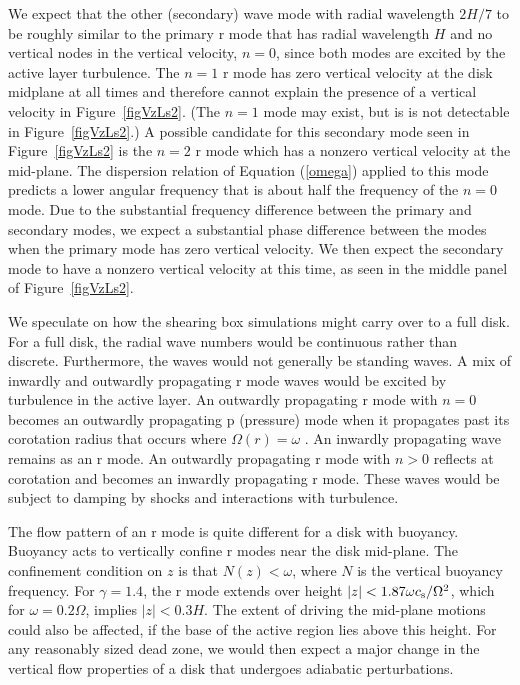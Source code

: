 We expect that the other (secondary) wave mode with radial wavelength $2H/7$ to be roughly similar to the primary r mode that has radial wavelength $H$ and no vertical nodes in the vertical velocity, $n=0$, 
since both modes are excited by the active layer turbulence.
The $n=1$ r mode has zero vertical velocity at the disk midplane at all times
and therefore cannot explain the presence of a vertical velocity in Figure~\ref{figVzLs2}. (The $n=1$ mode may exist, but is
is not detectable in Figure~\ref{figVzLs2}.)
A possible candidate for this secondary mode seen in Figure~\ref{figVzLs2} is the $n=2$ r mode which has a nonzero vertical velocity at the mid-plane.  The dispersion relation of Equation (\ref{omega}) applied to this mode predicts a lower angular frequency that is about half the frequency of the $n=0$ mode.  Due to the substantial frequency difference between the primary and secondary modes, we expect a substantial phase difference between the modes when the primary mode has zero vertical velocity.  We then expect the secondary mode to have a nonzero vertical velocity at this time, as seen in the middle panel of Figure~\ref{figVzLs2}. 

We speculate on how the shearing box simulations might carry over to a full disk.
For a full disk, the radial wave numbers would be continuous rather than  discrete.
Furthermore, the waves would not generally be standing waves. A mix of inwardly
and outwardly propagating r mode waves would be excited by turbulence in the active layer. 
An outwardly propagating  r mode with $n=0$ becomes an outwardly propagating p (pressure) mode when it propagates past  its corotation radius that occurs
where $\Omega(r) = \omega$ \citep{lubow93}.  An inwardly propagating wave  remains as an r mode.
 An outwardly propagating  r mode with $n>0$ reflects at corotation 
and becomes an inwardly propagating r mode.  These waves would be subject
to damping by shocks and interactions with turbulence.

The flow pattern of an r mode is
quite different for a disk with buoyancy. Buoyancy acts to
vertically confine r modes near the disk mid-plane. The confinement condition on $z$ is that $N(z) < \omega$, where $N$ is the vertical
buoyancy frequency.
For $\gamma = 1.4$, the r mode extends over height $|z| <
1.87 \omega c_{\rm s}/\Omega^2$, which for $\omega=0.2 \Omega$, implies $|z| < 0.3 H$. The extent of driving the mid-plane motions could also be affected, if the base of the active region lies above this height. For any
reasonably sized dead zone, we would then expect a major change in the vertical flow properties of a disk that undergoes adiabatic perturbations.






